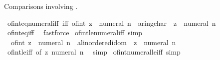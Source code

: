 \begin{isabellebody}
%
\begin{isamarkuptext}%
Comparisons involving .%
\end{isamarkuptext}\isamarkuptrue%
\isamarkupfalse%
\ of{\isacharunderscore}{\kern0pt}int{\isacharunderscore}{\kern0pt}eq{\isacharunderscore}{\kern0pt}numeral{\isacharunderscore}{\kern0pt}iff\ {\isacharbrackleft}{\kern0pt}iff{\isacharbrackright}{\kern0pt}{\isacharcolon}{\kern0pt}\ {\isachardoublequoteopen}of{\isacharunderscore}{\kern0pt}int\ z\ {\isacharequal}{\kern0pt}\ {\isacharparenleft}{\kern0pt}numeral\ n\ {\isacharcolon}{\kern0pt}{\isacharcolon}{\kern0pt}\ {\isacharprime}{\kern0pt}a{\isacharcolon}{\kern0pt}{\isacharcolon}{\kern0pt}ring{\isacharunderscore}{\kern0pt}char{\isacharunderscore}{\kern0pt}{}{\isacharparenright}{\kern0pt}\ {\isasymlongleftrightarrow}\ z\ {\isacharequal}{\kern0pt}\ numeral\ n{\isachardoublequoteclose}\isanewline
%
\isadelimproof
\ \ %
\endisadelimproof
%
\isatagproof
{}\isamarkupfalse%
\ of{\isacharunderscore}{\kern0pt}int{\isacharunderscore}{\kern0pt}eq{\isacharunderscore}{\kern0pt}iff\ \isamarkupfalse%
\ fastforce%
\endisatagproof
{\isafoldproof}%
%
\isadelimproof
\isanewline
%
\endisadelimproof
\isanewline
{}\isamarkupfalse%
\ of{\isacharunderscore}{\kern0pt}int{\isacharunderscore}{\kern0pt}le{\isacharunderscore}{\kern0pt}numeral{\isacharunderscore}{\kern0pt}iff\ {\isacharbrackleft}{\kern0pt}simp{\isacharbrackright}{\kern0pt}{\isacharcolon}{\kern0pt}\isanewline
\ \ {\isachardoublequoteopen}of{\isacharunderscore}{\kern0pt}int\ z\ {\isasymle}\ {\isacharparenleft}{\kern0pt}numeral\ n\ {\isacharcolon}{\kern0pt}{\isacharcolon}{\kern0pt}\ {\isacharprime}{\kern0pt}a{\isacharcolon}{\kern0pt}{\isacharcolon}{\kern0pt}linordered{\isacharunderscore}{\kern0pt}idom{\isacharparenright}{\kern0pt}\ {\isasymlongleftrightarrow}\ z\ {\isasymle}\ numeral\ n{\isachardoublequoteclose}\isanewline
%
\isadelimproof
\ \ %
\endisadelimproof
%
\isatagproof
{}\isamarkupfalse%
\ of{\isacharunderscore}{\kern0pt}int{\isacharunderscore}{\kern0pt}le{\isacharunderscore}{\kern0pt}iff\ {\isacharbrackleft}{\kern0pt}of\ z\ {\isachardoublequoteopen}numeral\ n{\isachardoublequoteclose}{\isacharbrackright}{\kern0pt}\ \isamarkupfalse%
\ simp%
\endisatagproof
{\isafoldproof}%
%
\isadelimproof
\isanewline
%
\endisadelimproof
\isanewline
{}\isamarkupfalse%
\ of{\isacharunderscore}{\kern0pt}int{\isacharunderscore}{\kern0pt}numeral{\isacharunderscore}{\kern0pt}le{\isacharunderscore}{\kern0pt}iff\ {\isacharbrackleft}{\kern0pt}simp{\isacharbrackright}{\kern0pt}{\isacharcolon}{\kern0pt}\isanewline

\end{isabellebody}

